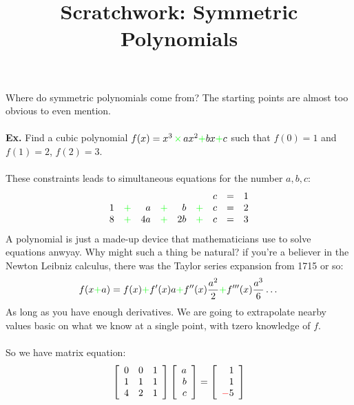 \documentclass[12pt]{article}
\title{Scratchwork: Symmetr{\color{blue}i}c Polynom{\color{blue}i}als}
\date{}
\begin{document}

\sffamily

\maketitle

\noindent Where do symmetr{\color{blue}i}c polynom{\color{blue}i}als come from?  The start{\color{blue}i}ng po{\color{blue}i}nts are almost too obv{\color{blue}i}ous to even ment{\color{blue}i}on. \\ \\
\textbf{Ex.} F{\color{blue}i}nd a cub{\color{blue}i}c polynom{\color{blue}i}al $f(x) = x^3 {\color{green}\,\times\,} ax^2 {\color{green}+} bx {\color{green}+} c$ such that $f(0)=1$ and $f(1) = 2$, $f(2) = 3$. \\ \\
These constra{\color{blue}i}nts leads to s{\color{blue}i}multaneous equat{\color{blue}i}ons for the number $a,b,c$:
$$\begin{array}{rcrcrcrcc}
    &   &    &   &    &  & c &=& 1 \\
 1  & {\color{green}+} &  a & {\color{green}+} & b  &{\color{green}+} & c &=& 2 \\
 8  & {\color{green}+} & 4a & {\color{green}+} & 2b &{\color{green}+} & c &=& 3 
\end{array}$$
A polynom{\color{blue}i}al {\color{blue}i}s just a made{\color{red}-}up dev{\color{blue}i}ce that mathemat{\color{blue}i}c{\color{blue}i}ans use to solve equat{\color{blue}i}ons anwyay.  Why m{\color{blue}i}ght such a th{\color{blue}i}ng be natural?  {\color{blue}i}f you're a bel{\color{blue}i}ever {\color{blue}i}n the Newton Le{\color{blue}i}bn{\color{blue}i}z calculus, there was the Taylor ser{\color{blue}i}es expans{\color{blue}i}on from 1715 or so:
$$ f(x{\color{green}+}a) = f(x) {\color{green}+} f'(x) a {\color{green}+} f''(x) \frac{a^2}{2} {\color{green}+} f'''(x) \frac{a^3}{6}\dots $$
As long as you have enough der{\color{blue}i}vat{\color{blue}i}ves.  We are go{\color{blue}i}ng to extrapolate nearby values bas{\color{blue}i}c on what we know at a s{\color{blue}i}ngle po{\color{blue}i}nt, w{\color{blue}i}th t{zero} knowledge of $f$. \\ \\
So we have matr{\color{blue}i}x equat{\color{blue}i}on:
$$
\left[ 
\begin{array}{rrr}  0 & 0 & 1 \\
 1 & 1 & 1 \\
 4 & 2 & 1 \end{array}\right]
\left[ 
\begin{array}{r} a \\
b  \\
c  \end{array}\right] = 
\left[ 
\begin{array}{r} 1 \\
1  \\
{\color{red}-}5 \end{array}\right] 
 $$
\end{document}
